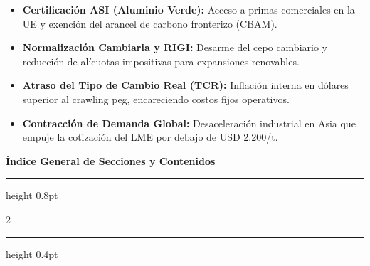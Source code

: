 \documentclass[10pt,a4paper]{article}
\begin{document}
\vspace{0.15cm}
\noindent
\begin{tcolorbox}[colback=white, colframe=gsblue!40, boxrule=0.5pt, top=2pt, bottom=2pt, left=4pt, right=4pt, title={\small\sffamily \textbf{Catalizadores Clave y Factores de Riesgo (12--18 meses)}}, coltitle=gsnavy]
    \footnotesize
    \begin{itemize}
        \setlength{\itemsep}{0pt}
        \item[\color{aluargreen}$\uparrow$] \textbf{Certificación ASI (Aluminio Verde):} Acceso a primas comerciales en la UE y exención del arancel de carbono fronterizo (CBAM).
        \item[\color{aluargreen}$\uparrow$] \textbf{Normalización Cambiaria y RIGI:} Desarme del cepo cambiario y reducción de alícuotas impositivas para expansiones renovables.
        \item[\color{riskred}$\downarrow$] \textbf{Atraso del Tipo de Cambio Real (TCR):} Inflación interna en dólares superior al crawling peg, encareciendo costos fijos operativos.
        \item[\color{riskred}$\downarrow$] \textbf{Contracción de Demanda Global:} Desaceleración industrial en Asia que empuje la cotización del LME por debajo de USD 2.200/t.
    \end{itemize}
\end{tcolorbox}

\vspace{0.08cm}

\clearpage


\begin{center}
    {\large\georgiahead\bfseries\color{gsnavy} Índice General de Secciones y Contenidos}
\end{center}
\vspace{-0.2cm}
\hrule height 0.8pt
\vspace{0.2cm}

\begin{multicols}{2}
\small
\makeatletter
{}
\makeatother
\end{multicols}

\vspace{0.2cm}
\hrule height 0.4pt
\vspace{0.15cm}
\end{document}
